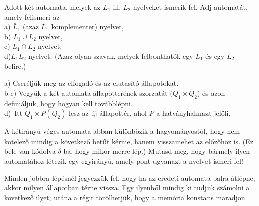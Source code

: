\begin{Exercise}[counter={sorszam}, difficulty=0]
	 Adott két automata, melyek az $L_1$ ill. $L_2$ nyelveket ismerik fel. Adj automatát, amely felismeri az\\
a) $\bar L_1$ (azaz $L_1$ komplementer) nyelvet,\\
b) $L_1 \cup L_2$ nyelvet,\\
c) $L_1 \cap L_2$ nyelvet,\\
d)\hard $L_1L_2$ nyelvet. (Azaz olyan szavak, melyek felbonthatók egy $L_1$ és egy $L_2$-belire.)
\end{Exercise}
\begin{Answer}
	a) Cser\'elj\"uk meg az elfogad\'o \'es az elutas\'it\'o \'allapotokat.\\
	b-c) Vegy\"uk a k\'et automata \'allapotter\'enek szorzat\'at ($Q_1\times Q_2$) \'es azon defini\'aljuk, hogy hogyan kell tov\'abbl\'epni.\\
	d)~\hard Itt $Q_1\times P(Q_2)$ lesz az \'uj \'allapott\'er, ahol $P$ a hatv\'anyhalmazt jel\"oli.
\end{Answer}


\begin{Exercise}[counter={sorszam}, difficulty=1]
	A kétirányú véges automata abban különbözik a hagyományostól, hogy nem kötelező mindig a következ\H o bet\H ut kérnie, hanem visszamehet az előzőhöz is. (Ez bele van kódolva $\delta$-ba, hogy mikor merre lép.) Mutasd meg, hogy bármely ilyen automatához létezik egy egyirányú, amely pont ugyanazt a nyelvet ismeri fel!
\end{Exercise}	
\begin{Answer}
	Minden jobbra l\'ep\'esn\'el jegyezz\"uk fel, hogy ha az eredeti automata balra \'atl\'epne, akkor milyen \'allapotban t\'erne vissza.
	Egy ilyenb\H ol mindig ki tudjuk sz\'amolni a k\"ovetkez\H o ilyet; ut\'ana a r\'egit t\"or\"olhetj\"uk, hogy a mem\'oria konstans maradjon.
\end{Answer}	

